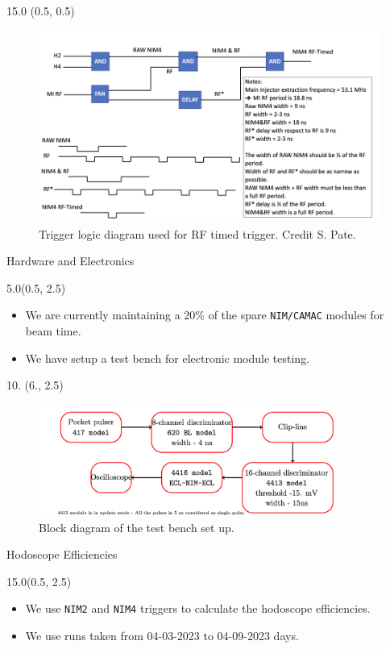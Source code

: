 \documentclass[12pt, xcolor={dvipsnames}, aspectratio = 169, sans,mathserif]{beamer}
\newenvironment{List}[2]
{
\begin{textblock}{#1}#2
\begin{itemize}
}
{
\end{itemize}
\end{textblock}
}
\newenvironment{Pic}[2]
{
\begin{textblock}{#1} #2
\begin{figure}
}
{
\end{figure}
\end{textblock}
}
\begin{document}
\begin{frame}
\begin{Pic}{15.0}{(0.5, 0.5)}
  \includegraphics[width=13.0cm]{imgs/rf_timing.png}
  \caption{Trigger logic diagram used for RF timed trigger. Credit S. Pate.}
\end{Pic}
\end{frame}

\begin{frame}[fragile]{Hardware and Electronics}
\begin{List}{5.0}{(0.5, 2.5)}

  \item We are currently maintaining a 20\% of the spare \verb|NIM/CAMAC|  modules for beam time.

  \item We have setup a test bench for electronic module testing.
\end{List}

\begin{Pic}{10.}{(6., 2.5)}
  \includegraphics[width=10.0cm]{imgs/test_bench.png}
  \caption{Block diagram of the test bench set up.}
\end{Pic}

\end{frame}

\begin{frame}[fragile]{Hodoscope Efficiencies}
\begin{List}{15.0}{(0.5, 2.5)}

  \item We use \verb|NIM2| and \verb|NIM4| triggers to calculate the hodoscope efficiencies.

  \item We use runs taken from 04-03-2023 to 04-09-2023 days.

\end{List}
\end{frame}
\end{document}
